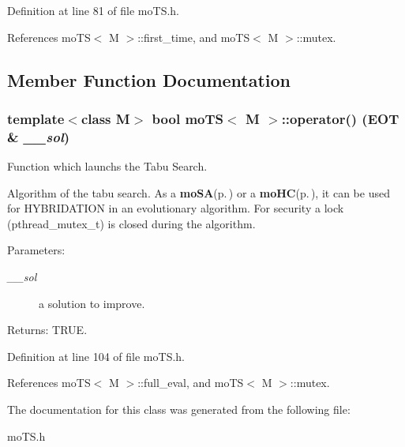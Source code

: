 Definition at line 81 of file mo\-TS.h.

References mo\-TS$<$ M $>$::first\_\-time, and mo\-TS$<$ M $>$::mutex.

\subsection{Member Function Documentation}
\subsubsection{\setlength{\rightskip}{0pt plus 5cm}template$<$class M$>$ bool {\bf mo\-TS}$<$ M $>$::operator() ({\bf EOT} \& {\em \_\-\_\-sol})\hspace{0.3cm}{\tt  [inline]}}\label{classmo_t_s_94d25a76fe1bc9ef0bbd0358ff55aceb}


Function which launchs the Tabu Search. 

Algorithm of the tabu search. As a {\bf mo\-SA}{\rm (p.\,\pageref{classmo_s_a})} or a {\bf mo\-HC}{\rm (p.\,\pageref{classmo_h_c})}, it can be used for HYBRIDATION in an evolutionary algorithm. For security a lock (pthread\_\-mutex\_\-t) is closed during the algorithm.

\begin{Desc}
\item[Parameters:]
\begin{description}
\item[{\em \_\-\_\-sol}]a solution to improve. \end{description}
\end{Desc}
\begin{Desc}
\item[Returns:]TRUE. \end{Desc}


Definition at line 104 of file mo\-TS.h.

References mo\-TS$<$ M $>$::full\_\-eval, and mo\-TS$<$ M $>$::mutex.

The documentation for this class was generated from the following file:\begin{CompactItemize}
\item 
mo\-TS.h\end{CompactItemize}
